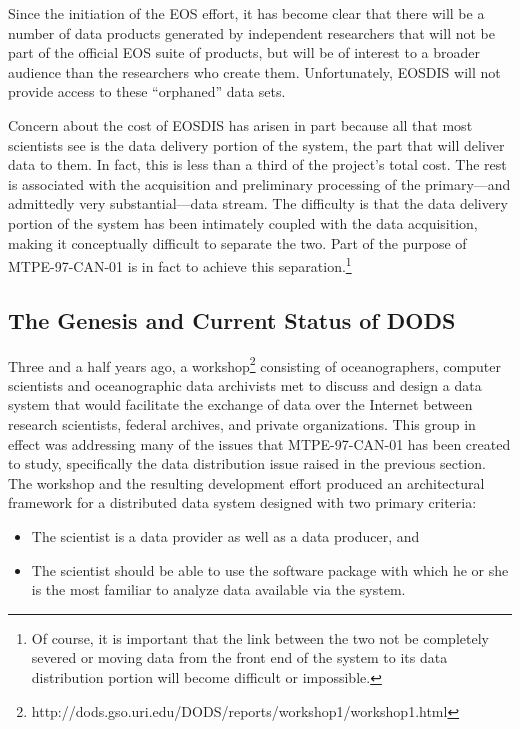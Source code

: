 \documentclass[12pt]{article}
\begin{document}
Since the initiation of the \acs{EOS} effort, it has become clear that
there will be a number of data products generated by independent
researchers that will not be part of the official \acs{EOS} suite of
products, but will be of interest to a broader audience than the
researchers who create them. Unfortunately, \acs{EOSDIS} will not 
provide access to these ``orphaned'' data sets. 

Concern about the cost of \acs{EOSDIS} has arisen in part
because all that most scientists see is the data delivery
portion of the system, the part that will deliver data to them. In fact,
this is less than a third of the project's total cost. The rest
is associated with the acquisition and preliminary processing of the
primary---and admittedly very substantial---data stream. The
difficulty is that the data delivery portion of the system has been
intimately coupled with the data acquisition, making it conceptually
difficult to separate the two. Part of the purpose of MTPE-97-CAN-01
is in fact to achieve this separation.\footnote{Of course, it is
important that the link between the two not be completely severed or
moving data from the front end of the system to its data distribution
portion will become difficult or impossible.}

\subsection{The Genesis and Current Status of \ac{DODS}}\label{dods-overview}

Three and a half years ago, a workshop\footnote{
http://dods.gso.uri.edu/DODS/reports/workshop1/workshop1.html}
consisting of oceanographers, computer scientists and oceanographic
data archivists met to discuss and design a data system that would
facilitate the exchange of data over the Internet between research
scientists, federal archives, and private organizations. This group in
effect was addressing many of the issues that MTPE-97-CAN-01 has been
created to study, specifically the data distribution issue raised in
the previous section. The workshop and the resulting development
effort produced an architectural framework for a distributed data
system designed with two primary criteria:

\begin{itemize}
\item The scientist is a data provider as well as a data producer, and

\item The scientist should be able to use the software package with
which he or she is the most familiar to analyze data available via the
system.
\end{itemize}
\end{document}

